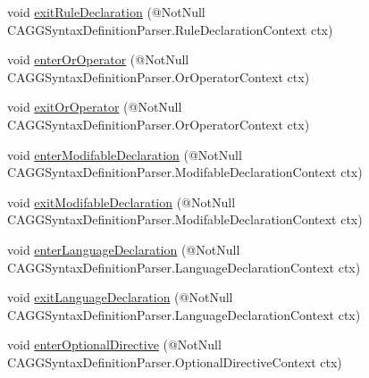 \begin{DoxyCompactItemize}
\item 
void \hyperlink{classit_1_1emarolab_1_1cagg_1_1core_1_1language_1_1parser_1_1ANTLRInterface_1_1ANTLRGenerated_1_1a45b55289931e185944c10a916c8cdd_a4a292982b3df6dd59bae258da003dd05}{exit\-Rule\-Declaration} (@Not\-Null C\-A\-G\-G\-Syntax\-Definition\-Parser.\-Rule\-Declaration\-Context ctx)
\item 
void \hyperlink{classit_1_1emarolab_1_1cagg_1_1core_1_1language_1_1parser_1_1ANTLRInterface_1_1ANTLRGenerated_1_1a45b55289931e185944c10a916c8cdd_a2a9ec0f5e0d8204a3a3c0e5fc8320e27}{enter\-Or\-Operator} (@Not\-Null C\-A\-G\-G\-Syntax\-Definition\-Parser.\-Or\-Operator\-Context ctx)
\item 
void \hyperlink{classit_1_1emarolab_1_1cagg_1_1core_1_1language_1_1parser_1_1ANTLRInterface_1_1ANTLRGenerated_1_1a45b55289931e185944c10a916c8cdd_a73f48c2726dce38c350be9de97af5488}{exit\-Or\-Operator} (@Not\-Null C\-A\-G\-G\-Syntax\-Definition\-Parser.\-Or\-Operator\-Context ctx)
\item 
void \hyperlink{classit_1_1emarolab_1_1cagg_1_1core_1_1language_1_1parser_1_1ANTLRInterface_1_1ANTLRGenerated_1_1a45b55289931e185944c10a916c8cdd_a3462349f03c3be734e8269eb368e692d}{enter\-Modifable\-Declaration} (@Not\-Null C\-A\-G\-G\-Syntax\-Definition\-Parser.\-Modifable\-Declaration\-Context ctx)
\item 
void \hyperlink{classit_1_1emarolab_1_1cagg_1_1core_1_1language_1_1parser_1_1ANTLRInterface_1_1ANTLRGenerated_1_1a45b55289931e185944c10a916c8cdd_a9d7f208e5fb125b6316eb8bdb4c1dff2}{exit\-Modifable\-Declaration} (@Not\-Null C\-A\-G\-G\-Syntax\-Definition\-Parser.\-Modifable\-Declaration\-Context ctx)
\item 
void \hyperlink{classit_1_1emarolab_1_1cagg_1_1core_1_1language_1_1parser_1_1ANTLRInterface_1_1ANTLRGenerated_1_1a45b55289931e185944c10a916c8cdd_a4337cfef5f93649a7c619ea952cdde7d}{enter\-Language\-Declaration} (@Not\-Null C\-A\-G\-G\-Syntax\-Definition\-Parser.\-Language\-Declaration\-Context ctx)
\item 
void \hyperlink{classit_1_1emarolab_1_1cagg_1_1core_1_1language_1_1parser_1_1ANTLRInterface_1_1ANTLRGenerated_1_1a45b55289931e185944c10a916c8cdd_a1ad0da5e8427e6ed6c75127dc07a898e}{exit\-Language\-Declaration} (@Not\-Null C\-A\-G\-G\-Syntax\-Definition\-Parser.\-Language\-Declaration\-Context ctx)
\item 
void \hyperlink{classit_1_1emarolab_1_1cagg_1_1core_1_1language_1_1parser_1_1ANTLRInterface_1_1ANTLRGenerated_1_1a45b55289931e185944c10a916c8cdd_ac27965d090cca981a3b761b0036ea36f}{enter\-Optional\-Directive} (@Not\-Null C\-A\-G\-G\-Syntax\-Definition\-Parser.\-Optional\-Directive\-Context ctx)

\end{DoxyCompactItemize}
